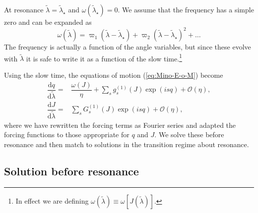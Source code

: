 \documentclass[aps,prd,amsfonts,amssymb,amsmath,nofootinbib,showpacs,superscriptaddress,twocolumn,floatfix]{revtex4-1}
\newcommand{\dd}{\ensuremath{\mathrm{d}}}
\newcommand{\diff}[2]{\ensuremath{\dfrac{\dd {#1}}{\dd {#2}}}}
\newcommand{\order}[1]{\ensuremath{\mathcal{O}({#1})}}
\begin{document}
At resonance $\widetilde{\lambda} = \widetilde{\lambda}_\star$ and $\omega\left(\widetilde{\lambda}_\star\right) = 0$. We assume that the frequency has a simple zero and can be expanded as
\begin{equation}
\omega\left(\widetilde{\lambda}\right) = \varpi_1\left(\widetilde{\lambda} - \widetilde{\lambda}_\star\right) + \varpi_2\left(\widetilde{\lambda} - \widetilde{\lambda}_\star\right)^2 + \ldots
\label{eq:omega-series}
\end{equation}
The frequency is actually a function of the angle variables, but since these evolve with $\widetilde{\lambda}$ it is safe to write it as a function of the slow time.\footnote{In effect we are defining $\omega\left(\tilde{\lambda}\right) \equiv \omega\left[J\left(\tilde{\lambda}\right)\right]$.}

Using the slow time, the equations of motion (\ref{eq:Mino-E-o-M}) become
\begin{subequations}
\begin{align}
\diff{q}{\widetilde{\lambda}} = {} & \dfrac{\omega(J)}{\eta} + \sum_s g_s^{(1)}(J)\exp(is q)  + \order{\eta}, \\
\diff{J}{\widetilde{\lambda}} = {} & \sum_s G_s^{(1)}(J)\exp(is q) + \order{\eta},
\end{align}
\end{subequations}
where we have rewritten the forcing terms as Fourier series and adapted the forcing functions to those appropriate for $q$ and $J$. We solve these before resonance and then match to solutions in the transition regime about resonance.

\subsection{Solution before resonance}\label{sec:before-res}
\end{document}

